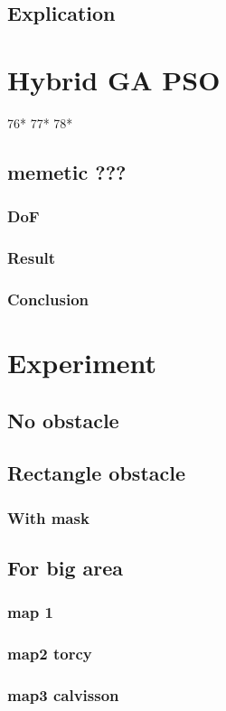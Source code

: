 	\subsection{Explication}

\section{Hybrid GA PSO}
 76* 77* 78*
	\subsection{memetic ???}
		\subsubsection{DoF}
		\subsubsection{Result}
		\subsubsection{Conclusion}
		
\section{Experiment}
	\subsection{No obstacle }
	\subsection{Rectangle obstacle}
	\subsubsection{With mask}
	\subsection{For big area}
		\subsubsection{map 1}
		\subsubsection{map2 torcy}
		\subsubsection{map3 calvisson}
		



 


